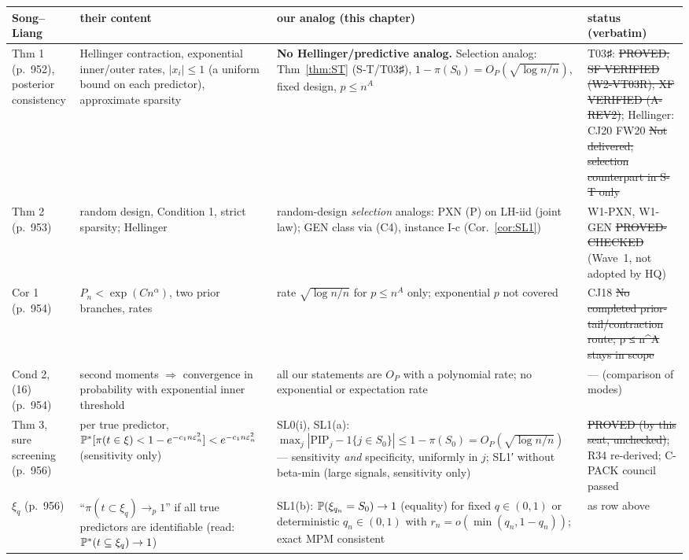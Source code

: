 {\small
\begin{xltabular}{\linewidth}{@{}p{2.4cm}p{3.5cm}Xp{3.4cm}@{}}
\toprule
Song--Liang & their content & our analog (this chapter) & status (verbatim) \\
\midrule
\endhead
Thm 1 (p.~952), posterior consistency & Hellinger contraction, exponential inner/outer rates, $|x_i|\le1$ (a uniform bound on each predictor), approximate sparsity & \textbf{No Hellinger/predictive analog.} Selection analog: Thm~\ref{thm:ST} (S-T/T03♯), $1-\pi(S_0)=O_P(\sqrt{\log n/n})$, fixed design, $p\le n^A$ & T03♯: \st{PROVED; SF VERIFIED (W2-VT03R); XF VERIFIED (A-REV2)}; Hellinger: CJ20 FW20 \st{Not delivered; selection counterpart in S-T only} \\
Thm 2 (p.~953) & random design, Condition 1, strict sparsity; Hellinger & random-design \emph{selection} analogs: PXN (P) on LH-iid (joint law); GEN class via (C4), instance I-c (Cor.~\ref{cor:SL1}) & W1-PXN, W1-GEN \st{PROVED-CHECKED} (Wave~1, not adopted by HQ) \\
Cor 1 (p.~954) & $P_n<\exp(Cn^\alpha)$, two prior branches, rates & rate $\sqrt{\log n/n}$ for $p\le n^A$ only; exponential $p$ not covered & CJ18 \st{No completed prior-tail/contraction route; p ≤ n\^{}A stays in scope} \\
Cond 2, (16) (p.~954) & second moments $\Rightarrow$ convergence in probability with exponential inner threshold & all our statements are $O_P$ with a polynomial rate; no exponential or expectation rate & — (comparison of modes) \\
Thm 3, sure screening (p.~956) & per true predictor, $\mathbb P^*[\pi(t\in\xi)<1-e^{-c_1n\varepsilon_n^2}]<e^{-c_1n\varepsilon_n^2}$ (sensitivity only) & SL0(i), SL1(a): $\max_j|\mathrm{PIP}_j-1\{j\in S_0\}|\le1-\pi(S_0)=O_P(\sqrt{\log n/n})$ — sensitivity \emph{and} specificity, uniformly in $j$; SL1′ without beta-min (large signals, sensitivity only) & \st{PROVED (by this seat, unchecked)}; R34 re-derived; C-PACK council passed \\
$\xi_q$ (p.~956) & ``$\pi(t\subset\xi_q)\to_p1$'' if all true predictors are identifiable (read: $\mathbb P^*(t\subseteq\xi_q)\to1$) & SL1(b): $\mathbb P(\xi_{q_n}=S_0)\to1$ (equality) for fixed $q\in(0,1)$ or deterministic $q_n\in(0,1)$ with $r_n=o(\min(q_n,1-q_n))$; exact MPM consistent & as row above \\

\end{xltabular}}
